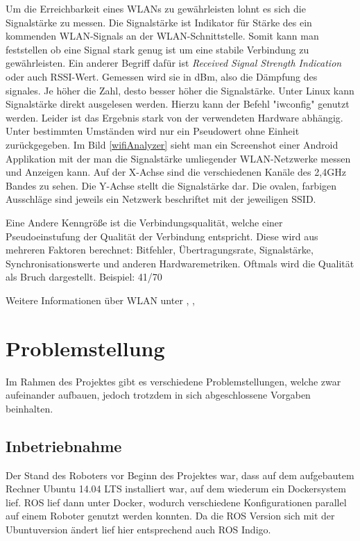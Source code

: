 \documentclass{scrartcl}%
\begin{document}
Um die Erreichbarkeit eines WLANs zu gewährleisten lohnt es sich die Signalstärke zu messen. Die Signalstärke ist Indikator für Stärke des ein kommenden WLAN-Signals an der WLAN-Schnittstelle. Somit kann man feststellen ob eine Signal stark genug ist um eine stabile Verbindung zu gewährleisten. Ein anderer Begriff dafür ist  \textit{Received Signal Strength Indication} oder auch RSSI-Wert. Gemessen wird sie in dBm, also die Dämpfung des signales. Je höher die Zahl, desto besser höher die Signalstärke. Unter Linux kann Signalstärke direkt  ausgelesen werden. Hierzu kann der Befehl "iwconfig" genutzt werden. Leider ist das Ergebnis stark von der verwendeten Hardware abhängig. Unter bestimmten Umständen wird nur ein Pseudowert ohne Einheit zurückgegeben.
Im Bild \ref{wifiAnalyzer} sieht man ein Screenshot einer Android Applikation mit der man die Signalstärke umliegender WLAN-Netzwerke messen und Anzeigen kann. Auf der X-Achse sind die verschiedenen Kanäle des 2,4GHz Bandes zu sehen. Die Y-Achse stellt die Signalstärke dar. Die ovalen, farbigen Ausschläge sind jeweils ein Netzwerk beschriftet mit der jeweiligen SSID.

Eine Andere Kenngröße ist die Verbindungsqualität, welche einer Pseudoeinstufung der Qualität der Verbindung entspricht. Diese wird aus mehreren Faktoren berechnet: Bitfehler, Übertragungsrate, Signalstärke, Synchronisationswerte und anderen Hardwaremetriken. Oftmals wird die Qualität als Bruch dargestellt. Beispiel: 41/70


Weitere Informationen über WLAN unter \cite{elektronikKompWlan}, \cite{elektronikKompWlanFreq}, \cite{heiseWlan}


\newpage
\section{Problemstellung}
Im Rahmen des Projektes gibt es verschiedene Problemstellungen, welche zwar aufeinander aufbauen, jedoch trotzdem in sich abgeschlossene Vorgaben beinhalten.

\subsection{Inbetriebnahme}
Der Stand des Roboters vor Beginn des Projektes war, dass auf dem aufgebautem Rechner Ubuntu 14.04 LTS installiert war, auf dem wiederum ein Dockersystem lief. ROS lief dann unter Docker, wodurch verschiedene Konfigurationen parallel auf einem Roboter genutzt werden konnten. Da die ROS Version sich mit der Ubuntuversion ändert lief hier entsprechend auch ROS Indigo.
\end{document}
